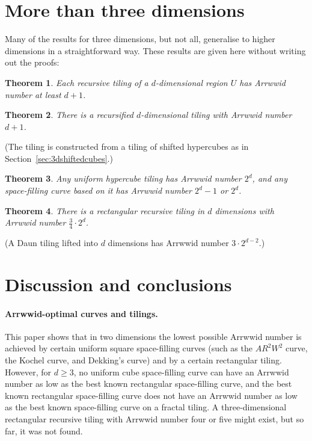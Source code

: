 \documentclass[11pt,a4paper]{article}
\newcommand{\unittile}{\ensuremath{U}\xspace}
\newcommand{\ARRWW}{$AR^2W^2$\xspace}
\newtheorem{theorem}{Theorem}
\begin{document}
\section{More than three dimensions}
Many of the results for three dimensions, but not all, generalise to higher dimensions in a straightforward way. These results are given here without writing out the proofs:

\begin{theorem}
Each recursive tiling of a $d$-dimensional region \unittile has Arrwwid number at least $d+1$.
\end{theorem}
\begin{theorem}
There is a recursified $d$-dimensional tiling with Arrwwid number $d+1$.
\end{theorem}
(The tiling is constructed from a tiling of shifted hypercubes as in Section~\ref{sec:3dshiftedcubes}.)
\begin{theorem}
Any uniform hypercube tiling has Arrwwid number $2^d$, and any space-filling curve based on it has Arrwwid number $2^d - 1$ or $2^d$.
\end{theorem}
\begin{theorem}
There is a rectangular recursive tiling in $d$ dimensions with Arrwwid number $\frac34 \cdot 2^d$.
\end{theorem}
(A Daun tiling lifted into $d$ dimensions has Arrwwid number $3 \cdot 2^{d-2}$.)

\section{Discussion and conclusions}\label{sec:conclusions}

\paragraph{Arrwwid-optimal curves and tilings.} This paper shows that in two dimensions the lowest possible Arrwwid number is achieved by certain uniform square space-filling curves (such as the \ARRWW curve, the Kochel curve, and Dekking's curve) and by a certain rectangular tiling. However, for $d \geq 3$, no uniform cube space-filling curve can have an Arrwwid number as low as the best known rectangular space-filling curve, and the best known rectangular space-filling curve does not have an Arrwwid number as low as the best known space-filling curve on a fractal tiling. A three-dimensional rectangular recursive tiling with Arrwwid number four or five might exist, but so far, it was not found.
\end{document}

